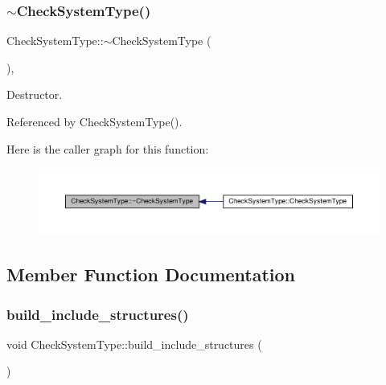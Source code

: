\subsubsection{\texorpdfstring{$\sim$\+Check\+System\+Type()}{~CheckSystemType()}}
{\footnotesize\ttfamily Check\+System\+Type\+::$\sim$\+Check\+System\+Type (\begin{DoxyParamCaption}{ }\end{DoxyParamCaption})\hspace{0.3cm}{\ttfamily [override]}, {\ttfamily [default]}}



Destructor. 



Referenced by Check\+System\+Type().

Here is the caller graph for this function\+:
\nopagebreak
\begin{figure}[H]
\begin{center}
\leavevmode
\includegraphics[width=350pt]{d9/df6/classCheckSystemType_a48875d72d3a25555a93445724530e775_icgraph}
\end{center}
\end{figure}


\subsection{Member Function Documentation}
\mbox{\label{classCheckSystemType_aec96886624b0bbe586f38f8bcf7cdca0}} 
\subsubsection{\texorpdfstring{build\+\_\+include\+\_\+structures()}{build\_include\_structures()}}
{\footnotesize\ttfamily void Check\+System\+Type\+::build\+\_\+include\+\_\+structures (\begin{DoxyParamCaption}{ }\end{DoxyParamCaption})\hspace{0.3cm}{\ttfamily [private]}}



